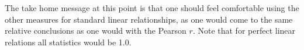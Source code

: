 \documentclass[english,nohyper,titlepage]{tufte-handout}\usepackage{graphicx, color}
\begin{document}
The take home message at this point is that one should feel comfortable using the other measures for standard linear relationships, as one would come to the same relative conclusions as one would with the Pearson $r$.  Note that for perfect linear relations all statistics would be 1.0. 
\end{document}
